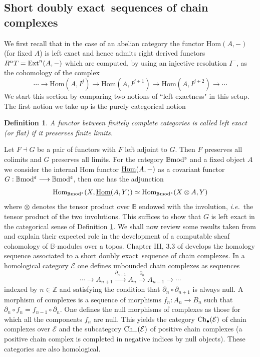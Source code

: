 \documentclass[12pt]{article}
\newtheorem{defn}[thm]{Definition}
\def\Hom{{\rm Hom}}
\def\Homi{{\underline{\rm Hom}}}
\def\ext{{\rm Ext}}
\def\B{{\mathbb B}}
\def\Z{{\mathbb Z}}
\def\exxx{{doubly exact}~}
\def\cE{{\mathcal E}}
\newcommand{\ie}{{\it i.e.\/}\ }
\def\Hom {{\mbox{Hom}}}
\def\chain{{\rm Ch_\bullet}}
\def\chainp{{\rm Ch_+}}
\def\b2{{\rm \B mod^{\mathfrak s}}}
\begin{document}
\subsection{Short \exxx sequences of chain complexes}\label{sect chain complexes}
We first recall that in the case of an abelian category the functor $\Hom(A,-)$ (for fixed $A$) is left exact and hence admits right derived functors $R^nT=\ext^n(A,-)$ which are computed, by using an injective resolution $I^-$, as the cohomology of the complex  
 $$
 \cdots\to\Hom(A,I^j)\to \Hom(A,I^{j+1})\to \Hom(A,I^{j+2}) \to\cdots
 $$
We start this section by comparing two notions of ``left exactness" in this setup. The first notion we take up is the purely categorical notion
\begin{defn}\label{categorical left exact}
A functor between finitely complete categories is called left exact (or flat) if it preserves finite limits.	
\end{defn}
 Let $F\dashv G$ be a pair of functors 
 with $F$
 left adjoint to $G$. Then $F$ 
preserves all colimits and $G$
 preserves all limits. For the category $\b2$ and a fixed object $A$ we consider the internal $\Hom$ functor $\Homi(A,-)$ as a covariant functor $G:\b2\longrightarrow \b2$, then  one has the adjunction 
 \begin{equation}\label{basic adjunction}
 \Hom_\b2(X,\Homi(A,Y))\simeq \Hom_\b2(X\otimes A,	Y)
 \end{equation}
where $\otimes$ denotes the tensor product over $\B$ endowed with the involution, \ie the tensor product of the two involutions. This suffices to show that $G$ is left  exact in the categorical sense of Definition \ref{categorical left exact}. 
 We shall now review some results taken from \cite{gra1} and explain their expected role in the development of a computable sheaf cohomology of $\B$-modules over a topos. Chapter III, 3.3 of \cite{gra1} develops the homology sequence associated to a short \exxx sequence of chain complexes. In a homological category $\cE$  one defines unbounded chain complexes as sequences
 $$
 \cdots \to A_{n+1}\stackrel{\partial_{n+1}}{\longrightarrow}A_n \stackrel{\partial_{n}}{\longrightarrow} A_{n-1}\to\cdots
 $$
 indexed by $n\in \Z$ and satisfying the condition that $\partial_n\circ \partial_{n+1}$ is always null. A morphism of complexes is a sequence of morphisms $f_n:A_n\to B_n$ such that $\partial_n\circ f_n=f_{n-1}\circ \partial_n$. One defines the null morphisms of complexes as those for which all the components $f_n$ are null. This yields the category $\chain(\cE)$ of chain complexes over $\cE$ and the subcategory $\chainp(\cE)$ of positive chain complexes (a positive chain complex is completed in negative indices by null objects). These categories are also homological. 
 
\end{document}
